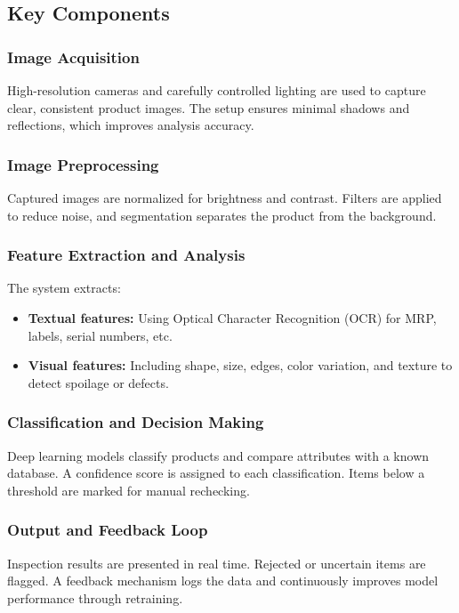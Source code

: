 \documentclass[12pt]{report}
\begin{document}
\subsection{Key Components}

\subsubsection{Image Acquisition}
High-resolution cameras and carefully controlled lighting are used to capture clear, consistent product images. The setup ensures minimal shadows and reflections, which improves analysis accuracy.

\subsubsection{Image Preprocessing}
Captured images are normalized for brightness and contrast. Filters are applied to reduce noise, and segmentation separates the product from the background.

\subsubsection{Feature Extraction and Analysis}
The system extracts:
\begin{itemize}
    \item \textbf{Textual features:} Using Optical Character Recognition (OCR) for MRP, labels, serial numbers, etc.
    \item \textbf{Visual features:} Including shape, size, edges, color variation, and texture to detect spoilage or defects.
\end{itemize}

\subsubsection{Classification and Decision Making}
Deep learning models classify products and compare attributes with a known database. A confidence score is assigned to each classification. Items below a threshold are marked for manual rechecking.

\subsubsection{Output and Feedback Loop}
Inspection results are presented in real time. Rejected or uncertain items are flagged. A feedback mechanism logs the data and continuously improves model performance through retraining.
\end{document}
